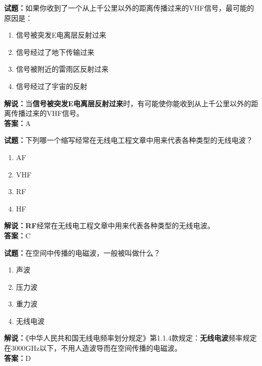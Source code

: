 \documentclass{ctexbook}
\begin{document}
\vspace{\baselineskip}

\noindent\textbf{试题：}如果你收到了一个从上千公里以外的距离传播过来的VHF信号，最可能的原因是：

\begin{enumerate}[leftmargin=3em]
  \item 信号被突发E电离层反射过来
  \item 信号经过了地下传输过来
  \item 信号被附近的雷雨区反射过来
  \item 信号经过了宇宙的反射
\end{enumerate}

\noindent\textbf{解说：}当\textbf{信号被突发E电离层反射过来}时，有可能使你能收到从上千公里以外的距离传播过来的VHF信号。\\\noindent\textbf{答案：}A

\vspace{\baselineskip}

\noindent\textbf{试题：}下列哪一个缩写经常在无线电工程文章中用来代表各种类型的无线电波？

\begin{enumerate}[leftmargin=3em]
  \item AF
  \item VHF
  \item RF
  \item HF
\end{enumerate}

\noindent\textbf{解说：RF}经常在无线电工程文章中用来代表各种类型的无线电波。\\\noindent\textbf{答案：}C

\vspace{\baselineskip}

\noindent\textbf{试题：}在空间中传播的电磁波，一般被叫做什么？

\begin{enumerate}[leftmargin=3em]
  \item 声波
  \item 压力波
  \item 重力波
  \item 无线电波
\end{enumerate}

\noindent\textbf{解说：}《中华人民共和国无线电频率划分规定》第1.1.4款规定：\textbf{无线电波}频率规定在3000\si{\GHz}以下，不用人造波导而在空间传播的电磁波。\\\noindent\textbf{答案：}D

\vspace{\baselineskip}
\end{document}
